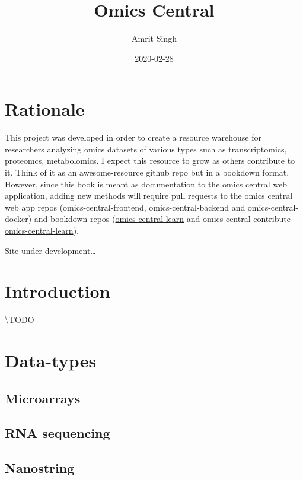 \documentclass[]{book}
\title{Omics Central}
\author{Amrit Singh}
\date{2020-02-28}
\begin{document}
\maketitle

{
\setcounter{tocdepth}{1}
\tableofcontents
}
\chapter{Rationale}\label{rationale}

This project was developed in order to create a resource warehouse for
researchers analyzing omics datasets of various types such as
transcriptomics, proteomcs, metabolomics. I expect this resource to grow
as others contribute to it. Think of it as an awesome-resource github
repo but in a bookdown format. However, since this book is meant as
documentation to the omics central web application, adding new methods
will require pull requests to the omics central web app repos
(omics-central-frontend, omics-central-backend and omics-central-docker)
and bookdown repos
(\href{https://github.com/singha53/omics-central-learn}{omics-central-learn}
and omics-central-contribute
\href{https://github.com/singha53/omics-central-contribute}{omics-central-learn}).

Site under development\ldots{}

\chapter{Introduction}\label{intro}

\textbackslash{}TODO

\chapter{Data-types}\label{data-types}

\section{Microarrays}\label{microarrays}

\section{RNA sequencing}\label{rna-sequencing}

\section{Nanostring}\label{nanostring}
\end{document}
